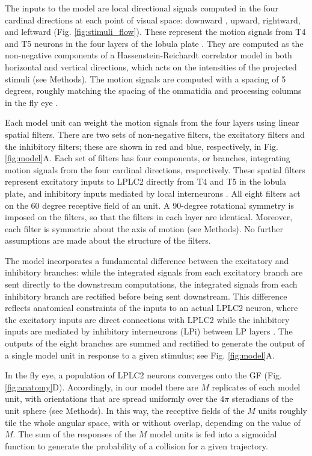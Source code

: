 \documentclass[pdftex,9pt,lineno]{elife}
\begin{document}
The inputs to the model are local directional signals computed in the four cardinal directions at each point of visual space: downward , upward, rightward, and leftward (Fig. \ref{fig:stimuli_flow}). These represent the motion signals from T4 and T5 neurons in the four layers of the lobula plate \citep{maisak2013directional}. They are computed as the non-negative components of a Hassenstein-Reichardt correlator model \citep{hassenstein1956systemtheoretische} in both horizontal and vertical directions, which acts on the intensities of the projected stimuli (see Methods). The motion signals are computed with a spacing of 5 degrees, roughly matching the spacing of the ommatidia and processing columns in the fly eye \citep{stavenga2003angular}.

Each model unit can weight the motion signals from the four layers using linear spatial filters. There are two sets of non-negative filters, the excitatory filters and the inhibitory filters; these are shown in red and blue, respectively, in Fig. \ref{fig:model}A. Each set of filters has four components, or branches, integrating motion signals from the four cardinal directions, respectively. These spatial filters represent excitatory inputs to LPLC2 directly from T4 and T5 in the lobula plate, and inhibitory inputs  mediated by local interneurons \citep{klapoetke2017ultra,mauss2015neural}. All eight filters act on the 60 degree receptive field of an unit. A 90-degree rotational symmetry is imposed on the filters, so that the filters in each layer are identical. Moreover, each filter is symmetric about the axis of motion (see Methods). No further assumptions are made about the structure of the filters.

The model incorporates a fundamental difference between the excitatory and inhibitory branches: while the integrated signals from each excitatory branch are sent directly to the downstream computations, the integrated signals from each inhibitory branch are rectified before being sent downstream. This difference reflects anatomical constraints of the inputs to an actual LPLC2 neuron, where the excitatory inputs are direct connections with LPLC2 while the inhibitory inputs are mediated by inhibitory interneurons (LPi) between LP layers \citep{mauss2015neural,klapoetke2017ultra}. The outputs of the eight branches are summed and rectified to generate the output of a single model unit in response to a given stimulus; see Fig. \ref{fig:model}A.

In the fly eye, a population of LPLC2 neurons converges onto the GF (Fig. \ref{fig:anatomy}D). Accordingly, in our model there are $M$ replicates of each model unit, with orientations that are spread uniformly over the $4\pi$ steradians of the unit sphere (see Methods). In this way, the receptive fields of the $M$ units roughly  tile the whole angular space, with or without overlap, depending on the value of $M$. The sum of the responses of the $M$ model units is fed into a sigmoidal function to generate the probability of a collision for a given trajectory.
\end{document}
